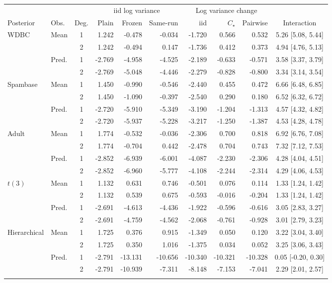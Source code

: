 \begin{tabular}{llcrrrrrrc}
\toprule
 & & & \multicolumn{3}{c}{iid log variance} & \multicolumn{3}{c}{Log variance change} & \\
\cmidrule(lr){4-6}\cmidrule(lr){7-9}
Posterior & Obs. & Deg. & Plain & Frozen & Same-run & iid & $C_\star$ & Pairwise & Interaction \\
\midrule
WDBC & Mean & 1 & 1.242 & -0.478 & -0.034 & -1.720 & 0.566 & 0.532 & 5.26 [5.08, 5.44] \\
 &  & 2 & 1.242 & -0.494 & 0.147 & -1.736 & 0.412 & 0.373 & 4.94 [4.76, 5.13] \\
 & Pred. & 1 & -2.769 & -4.958 & -4.525 & -2.189 & -0.633 & -0.571 & 3.58 [3.37, 3.79] \\
 &  & 2 & -2.769 & -5.048 & -4.446 & -2.279 & -0.828 & -0.800 & 3.34 [3.14, 3.54] \\
\addlinespace
Spambase & Mean & 1 & 1.450 & -0.990 & -0.546 & -2.440 & 0.455 & 0.472 & 6.66 [6.48, 6.85] \\
 &  & 2 & 1.450 & -1.090 & -0.397 & -2.540 & 0.290 & 0.180 & 6.52 [6.32, 6.72] \\
 & Pred. & 1 & -2.720 & -5.910 & -5.349 & -3.190 & -1.204 & -1.313 & 4.57 [4.32, 4.82] \\
 &  & 2 & -2.720 & -5.937 & -5.228 & -3.217 & -1.250 & -1.387 & 4.53 [4.28, 4.78] \\
\addlinespace
Adult & Mean & 1 & 1.774 & -0.532 & -0.036 & -2.306 & 0.700 & 0.818 & 6.92 [6.76, 7.08] \\
 &  & 2 & 1.774 & -0.704 & 0.442 & -2.478 & 0.704 & 0.743 & 7.32 [7.12, 7.53] \\
 & Pred. & 1 & -2.852 & -6.939 & -6.001 & -4.087 & -2.230 & -2.306 & 4.28 [4.04, 4.51] \\
 &  & 2 & -2.852 & -6.960 & -5.777 & -4.108 & -2.244 & -2.314 & 4.29 [4.06, 4.53] \\
\addlinespace
$t(3)$ & Mean & 1 & 1.132 & 0.631 & 0.746 & -0.501 & 0.076 & 0.114 & 1.33 [1.24, 1.42] \\
 &  & 2 & 1.132 & 0.539 & 0.675 & -0.593 & -0.016 & -0.204 & 1.33 [1.24, 1.42] \\
 & Pred. & 1 & -2.691 & -4.613 & -4.436 & -1.922 & -0.596 & -0.616 & 3.05 [2.83, 3.27] \\
 &  & 2 & -2.691 & -4.759 & -4.562 & -2.068 & -0.761 & -0.928 & 3.01 [2.79, 3.23] \\
\addlinespace
Hierarchical & Mean & 1 & 1.725 & 0.376 & 0.915 & -1.349 & 0.050 & 0.120 & 3.22 [3.04, 3.40] \\
 &  & 2 & 1.725 & 0.350 & 1.016 & -1.375 & 0.034 & 0.052 & 3.25 [3.06, 3.43] \\
 & Pred. & 1 & -2.791 & -13.131 & -10.656 & -10.340 & -10.321 & -10.328 & 0.05 [-0.20, 0.30] \\
 &  & 2 & -2.791 & -10.939 & -7.311 & -8.148 & -7.153 & -7.041 & 2.29 [2.01, 2.57] \\
\addlinespace
\bottomrule
\end{tabular}
